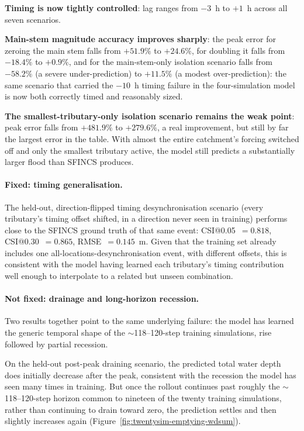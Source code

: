 \documentclass[12pt,a4paper]{report}
\begin{document}
{ \textbf{Timing is now tightly controlled}: lag ranges from
$-3$~h to $+1$~h across all seven scenarios. 
 
\textbf{Main-stem magnitude accuracy improves sharply}: the peak error for
zeroing the main stem falls from $+51.9\%$ to $+24.6\%$, for doubling it falls from
$-18.4\%$ to $+0.9\%$, and for the main-stem-only isolation scenario falls from
$-58.2\%$ (a severe under-prediction) to $+11.5\%$ (a modest over-prediction): the
same scenario that carried the $-10$~h timing failure in the four-simulation model is
now both correctly timed and reasonably sized.
 
\textbf{The smallest-tributary-only
isolation scenario remains the weak point}: peak error falls from $+481.9\%$
to $+279.6\%$, a real improvement, but still by far the largest error in the table. With almost the entire catchment's
forcing switched off and only the smallest tributary active, the model still predicts
a substantially larger flood than SFINCS produces.
 
 
 
\paragraph{Fixed: timing generalisation.}
The held-out, direction-flipped timing desynchronisation scenario (every tributary's
timing offset shifted, in a direction never seen in training) performs close to the
SFINCS ground truth of that same event: CSI@0.05~$=0.818$, CSI@0.30~$=0.865$,
RMSE~$=0.145$~m. Given that the training set
already includes one all-locations-desynchronisation event, with different
offsets, this is consistent with the model having learned each tributary's timing
contribution well enough to interpolate to a related but unseen combination.
 
\paragraph{Not fixed: drainage and long-horizon recession.}
Two results together point to the same underlying failure: the model has learned the
generic temporal shape of the $\sim$118--120-step training simulations, rise followed
by partial recession.
 
On the held-out post-peak draining scenario, the predicted total water depth does
initially decrease after the peak, consistent with the recession the model has seen
many times in training. But once the rollout continues past roughly the
$\sim$118--120-step horizon common to nineteen of the twenty training simulations,
rather than continuing to drain toward zero, the prediction settles and then slightly
increases again (Figure~\ref{fig:twentysim-emptying-wdsum}).
 
}
\end{document}

